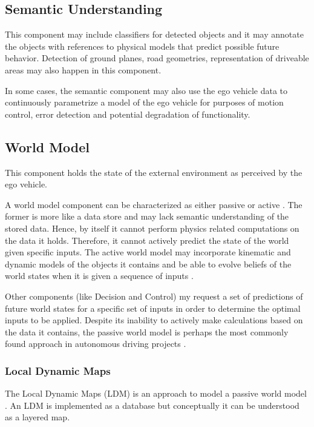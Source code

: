 \subsection{Semantic Understanding}
This component may include classifiers for detected objects and it may annotate the objects with references to physical models that predict possible future behavior. Detection of ground planes, road geometries, representation of driveable areas may also happen in this component.

In some cases, the semantic component may also use the ego vehicle data to continuously parametrize a model of the ego vehicle for purposes of motion control, error detection and potential degradation of functionality.

\subsection{World Model}
This component holds the state of the external environment as perceived by the ego vehicle.

A world model component can be characterized as either passive or active \cite{Bahere}. 
The former is more like a data store and may lack semantic understanding of the stored data. 
Hence, by itself it cannot perform physics related computations on the data it holds. 
Therefore, it cannot actively predict the state of the world given specific inputs. 
The active world model may incorporate kinematic and dynamic models of the objects it contains 
and be able to evolve beliefs of the world states when it is given a sequence of inputs \cite{Bahere}.

Other components (like Decision and Control) my request a set of predictions of future world states for a specific set of
inputs in order to determine the optimal inputs to be applied.
Despite its inability to actively make calculations based on the data it contains, the passive world model is perhaps the most commonly found approach in autonomous driving projects \cite{Bahere}. 


\subsubsection{Local Dynamic Maps}

The Local Dynamic Maps (LDM) is an approach to model a passive world model \cite{Bahere, ETSITR102}. 
An LDM is implemented as a database but conceptually it can be understood as a layered map. 

